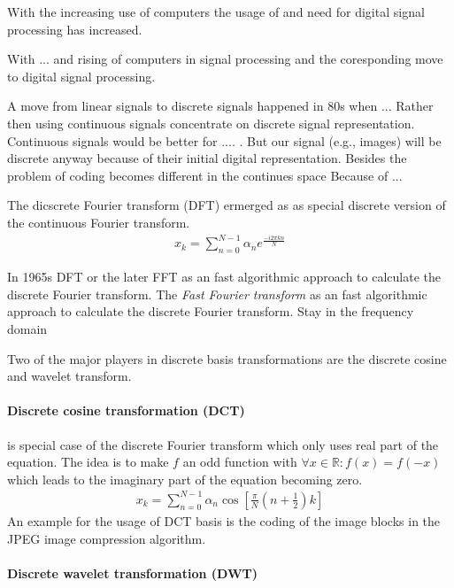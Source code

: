 With the increasing use of computers the usage of and need for digital signal
processing has increased.

With ... and rising of computers in signal processing and the coresponding move
to digital signal processing.

A move from linear signals to discrete signals happened in 80s when ... 
Rather then using continuous signals concentrate on discrete
signal representation. Continuous signals would be better for .... .  But our
signal (e.g., images) will be discrete anyway because of their initial digital
representation. Besides the problem of coding becomes different in the continues
space \cite{} Because of ...


The dicscrete Fourier transform (DFT) ermerged as as special discrete version of
the continuous Fourier transform.
\begin{align*}
 x_k = \sum_{n=0}^{N-1}\alpha_ne^{\frac{-i2\pi kn}{N}}
\end{align*}



In 1965s 
DFT or the later FFT as an fast algorithmic approach to calculate the discrete
Fourier transform.
The \emph{Fast Fourier transform}  as an fast algorithmic approach to calculate
the discrete Fourier transform.
Stay in the frequency domain

Two of the major players in discrete basis transformations are the discrete
cosine and wavelet transform.

\paragraph{Discrete cosine transformation (DCT)} is special case of the discrete
Fourier transform which only uses real part of the equation. The idea is to make
$f$ an odd function with $\forall x \in \mathbb{R} : f(x) = f(-x)$ which leads
to the imaginary part of the equation becoming zero.
\begin{align*}
x_k = \sum_{n=0}^{N-1}\alpha_n\cos \left[ \frac{\pi}{N} \left(
n+\frac{1}{2}\right) k\right]
\end{align*}
An example for the usage of DCT basis is the coding of the image blocks in the
JPEG image compression algorithm.


\paragraph{Discrete wavelet transformation (DWT)}

